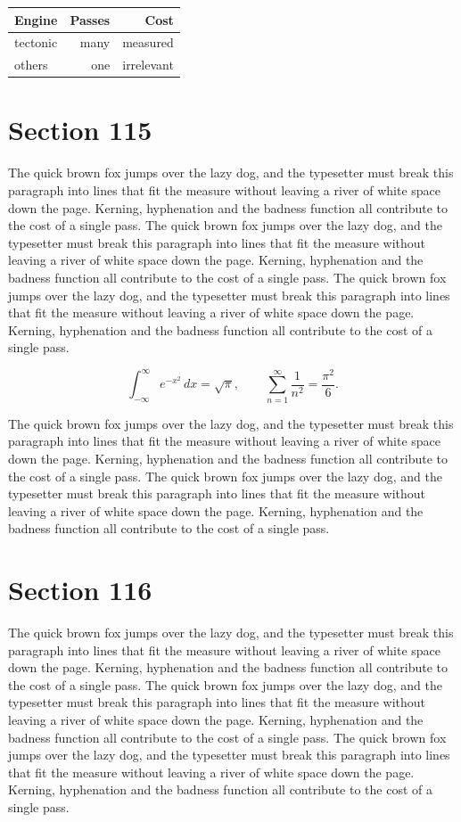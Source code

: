\documentclass{article}
\begin{document}
\begin{center}
\begin{tabular}{lrr}
\toprule
Engine & Passes & Cost \\
\midrule
tectonic & many & measured \\
others & one & irrelevant \\
\bottomrule
\end{tabular}
\end{center}

\section{Section 115}
The quick brown fox jumps over the lazy dog, and the typesetter must break this paragraph into lines that fit the measure without leaving a river of white space down the page. Kerning, hyphenation and the badness function all contribute to the cost of a single pass. The quick brown fox jumps over the lazy dog, and the typesetter must break this paragraph into lines that fit the measure without leaving a river of white space down the page. Kerning, hyphenation and the badness function all contribute to the cost of a single pass. The quick brown fox jumps over the lazy dog, and the typesetter must break this paragraph into lines that fit the measure without leaving a river of white space down the page. Kerning, hyphenation and the badness function all contribute to the cost of a single pass. 

\begin{equation}
\int_{-\infty}^{\infty} e^{-x^{2}}\,dx = \sqrt{\pi}, \qquad
\sum_{n=1}^{\infty} \frac{1}{n^{2}} = \frac{\pi^{2}}{6}.
\end{equation}

The quick brown fox jumps over the lazy dog, and the typesetter must break this paragraph into lines that fit the measure without leaving a river of white space down the page. Kerning, hyphenation and the badness function all contribute to the cost of a single pass. The quick brown fox jumps over the lazy dog, and the typesetter must break this paragraph into lines that fit the measure without leaving a river of white space down the page. Kerning, hyphenation and the badness function all contribute to the cost of a single pass. 
\section{Section 116}
The quick brown fox jumps over the lazy dog, and the typesetter must break this paragraph into lines that fit the measure without leaving a river of white space down the page. Kerning, hyphenation and the badness function all contribute to the cost of a single pass. The quick brown fox jumps over the lazy dog, and the typesetter must break this paragraph into lines that fit the measure without leaving a river of white space down the page. Kerning, hyphenation and the badness function all contribute to the cost of a single pass. The quick brown fox jumps over the lazy dog, and the typesetter must break this paragraph into lines that fit the measure without leaving a river of white space down the page. Kerning, hyphenation and the badness function all contribute to the cost of a single pass. 
\end{document}
